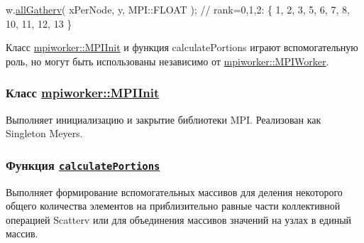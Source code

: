 \begin{DoxyCode}
  w.\hyperlink{classmpiworker_1_1MPIWorker_a49fda2aa379265e74f9b7504ad67ee9a}{allGatherv}( xPerNode, y, MPI::FLOAT );         \textcolor{comment}{// rank=0,1,2: \{ 1, 2, 3, 5, 6, 7, 8, 10, 11,
       12, 13 \}}
\end{DoxyCode}


Класс \hyperlink{classmpiworker_1_1MPIInit}{mpiworker\-::\-M\-P\-I\-Init} и функция calculate\-Portions играют вспомогательную роль, но могут быть использованы независимо от \hyperlink{classmpiworker_1_1MPIWorker}{mpiworker\-::\-M\-P\-I\-Worker}.

\subsubsection*{Класс \hyperlink{classmpiworker_1_1MPIInit}{mpiworker\-::\-M\-P\-I\-Init}}

Выполняет инициализацию и закрытие библиотеки M\-P\-I. Реализован как Singleton Meyers.

\subsubsection*{Функция \href{group__MPIWorker.html#ga6fd8303c1b4e39a4a623756fdcbeae6f}{\tt calculate\-Portions}}

Выполняет формирование вспомогательных массивов для деления некоторого общего количества элементов на приблизительно равные части коллективной операцией Scatterv или для объединения массивов значений на узлах в единый массив. 